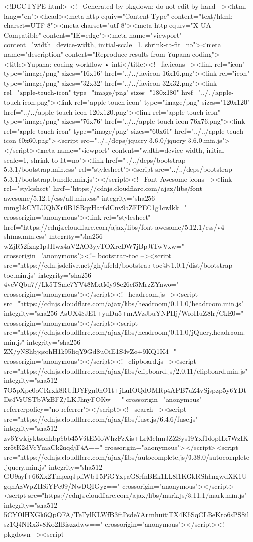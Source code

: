 <!DOCTYPE html>
<!-- Generated by pkgdown: do not edit by hand --><html lang="en"><head><meta http-equiv="Content-Type" content="text/html; charset=UTF-8"><meta charset="utf-8"><meta http-equiv="X-UA-Compatible" content="IE=edge"><meta name="viewport" content="width=device-width, initial-scale=1, shrink-to-fit=no"><meta name="description" content="Reproduce results from Yupana coding"><title>Yupana: coding workflow • inti</title><!-- favicons --><link rel="icon" type="image/png" sizes="16x16" href="../../favicon-16x16.png"><link rel="icon" type="image/png" sizes="32x32" href="../../favicon-32x32.png"><link rel="apple-touch-icon" type="image/png" sizes="180x180" href="../../apple-touch-icon.png"><link rel="apple-touch-icon" type="image/png" sizes="120x120" href="../../apple-touch-icon-120x120.png"><link rel="apple-touch-icon" type="image/png" sizes="76x76" href="../../apple-touch-icon-76x76.png"><link rel="apple-touch-icon" type="image/png" sizes="60x60" href="../../apple-touch-icon-60x60.png"><script src="../../deps/jquery-3.6.0/jquery-3.6.0.min.js"></script><meta name="viewport" content="width=device-width, initial-scale=1, shrink-to-fit=no"><link href="../../deps/bootstrap-5.3.1/bootstrap.min.css" rel="stylesheet"><script src="../../deps/bootstrap-5.3.1/bootstrap.bundle.min.js"></script><!-- Font Awesome icons --><link rel="stylesheet" href="https://cdnjs.cloudflare.com/ajax/libs/font-awesome/5.12.1/css/all.min.css" integrity="sha256-mmgLkCYLUQbXn0B1SRqzHar6dCnv9oZFPEC1g1cwlkk=" crossorigin="anonymous"><link rel="stylesheet" href="https://cdnjs.cloudflare.com/ajax/libs/font-awesome/5.12.1/css/v4-shims.min.css" integrity="sha256-wZjR52fzng1pJHwx4aV2AO3yyTOXrcDW7jBpJtTwVxw=" crossorigin="anonymous"><!-- bootstrap-toc --><script src="https://cdn.jsdelivr.net/gh/afeld/bootstrap-toc@v1.0.1/dist/bootstrap-toc.min.js" integrity="sha256-4veVQbu7//Lk5TSmc7YV48MxtMy98e26cf5MrgZYnwo=" crossorigin="anonymous"></script><!-- headroom.js --><script src="https://cdnjs.cloudflare.com/ajax/libs/headroom/0.11.0/headroom.min.js" integrity="sha256-AsUX4SJE1+yuDu5+mAVzJbuYNPHj/WroHuZ8Ir/CkE0=" crossorigin="anonymous"></script><script src="https://cdnjs.cloudflare.com/ajax/libs/headroom/0.11.0/jQuery.headroom.min.js" integrity="sha256-ZX/yNShbjqsohH1k95liqY9Gd8uOiE1S4vZc+9KQ1K4=" crossorigin="anonymous"></script><!-- clipboard.js --><script src="https://cdnjs.cloudflare.com/ajax/libs/clipboard.js/2.0.11/clipboard.min.js" integrity="sha512-7O5pXpc0oCRrxk8RUfDYFgn0nO1t+jLuIOQdOMRp4APB7uZ4vSjspzp5y6YDtDs4VzUSTbWzBFZ/LKJhnyFOKw==" crossorigin="anonymous" referrerpolicy="no-referrer"></script><!-- search --><script src="https://cdnjs.cloudflare.com/ajax/libs/fuse.js/6.4.6/fuse.js" integrity="sha512-zv6Ywkjyktsohkbp9bb45V6tEMoWhzFzXis+LrMehmJZZSys19Yxf1dopHx7WzIKxr5tK2dVcYmaCk2uqdjF4A==" crossorigin="anonymous"></script><script src="https://cdnjs.cloudflare.com/ajax/libs/autocomplete.js/0.38.0/autocomplete.jquery.min.js" integrity="sha512-GU9ayf+66Xx2TmpxqJpliWbT5PiGYxpaG8rfnBEk1LL8l1KGkRShhngwdXK1UgqhAzWpZHSiYPc09/NwDQIGyg==" crossorigin="anonymous"></script><script src="https://cdnjs.cloudflare.com/ajax/libs/mark.js/8.11.1/mark.min.js" integrity="sha512-5CYOlHXGh6QpOFA/TeTylKLWfB3ftPsde7AnmhuitiTX4K5SqCLBeKro6sPS8ilsz1Q4NRx3v8Ko2IBiszzdww==" crossorigin="anonymous"></script><!-- pkgdown --><script 
